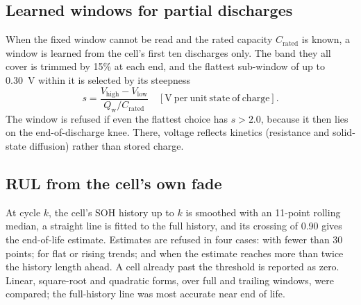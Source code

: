 \documentclass[preprint,12pt,authoryear]{elsarticle}
\newcommand{\Qw}{Q_{\mathrm{w}}}
\begin{document}
\subsection{Learned windows for partial discharges}
When the fixed window cannot be read and the rated capacity $C_\mathrm{rated}$
is known, a window is learned from the cell's first ten discharges only. The
band they all cover is trimmed by 15\% at each end, and the flattest sub-window
of up to 0.30~V within it is selected by its steepness
\begin{equation}
s = \frac{V_\mathrm{high}-V_\mathrm{low}}{\Qw/C_\mathrm{rated}}
\quad [\mathrm{V\ per\ unit\ state\ of\ charge}] .
\label{eq:steep}
\end{equation}
The window is refused if even the flattest choice has $s > 2.0$, because it
then lies on the end-of-discharge knee. There, voltage reflects kinetics
(resistance and solid-state diffusion) rather than stored charge.

\subsection{RUL from the cell's own fade}
At cycle $k$, the cell's SOH history up to $k$ is smoothed with an 11-point
rolling median, a straight line is fitted to the full history, and its crossing
of 0.90 gives the end-of-life estimate. Estimates are refused in four cases:
with fewer than 30 points; for flat or rising trends; and when the estimate
reaches more than twice the history length ahead. A cell already past the
threshold is reported as zero. Linear, square-root and quadratic forms, over
full and trailing windows, were compared; the full-history line was most
accurate near end of life.
\end{document}
